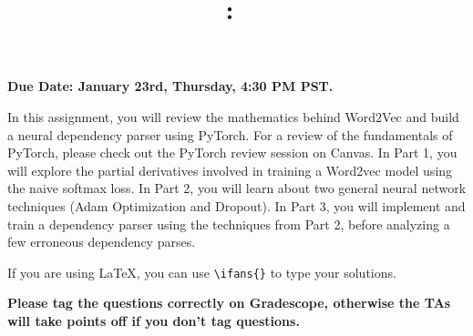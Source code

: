\documentclass[answers]{exam}
\title{
\vspace{-1in}
\textmd{\textbf{\hmwkClass:\ \hmwkTitle}}
}
\author{}
\date{}
\newif\ifanswers
\newcommand{\ifans}[1]{\ifanswers \color{red} \textbf{Solution: } #1 \color{black}\fi}
\begin{document}
\maketitle
\vspace{-3em}

\textbf{Due Date: January 23rd, Thursday, 4:30 PM PST.}

In this assignment, you will review the mathematics behind Word2Vec and build a neural dependency parser using PyTorch. For a review of the fundamentals of PyTorch, please check out the PyTorch review session on Canvas. In Part 1, you will explore the partial derivatives involved in training a Word2vec model using the naive softmax loss. In Part 2, you will learn about two general neural network techniques (Adam Optimization and Dropout). In Part 3, you will implement and train a dependency parser using the techniques from Part 2, before analyzing a few erroneous dependency parses.

If you are using LaTeX, you can use \verb!\ifans{}! to type your solutions.

\textbf{Please tag the questions correctly on Gradescope, otherwise the TAs will take points off if you don't tag questions.}
\begin{questions}
    
    \newpage
    
    \newpage
    
\end{questions}


\end{document}
